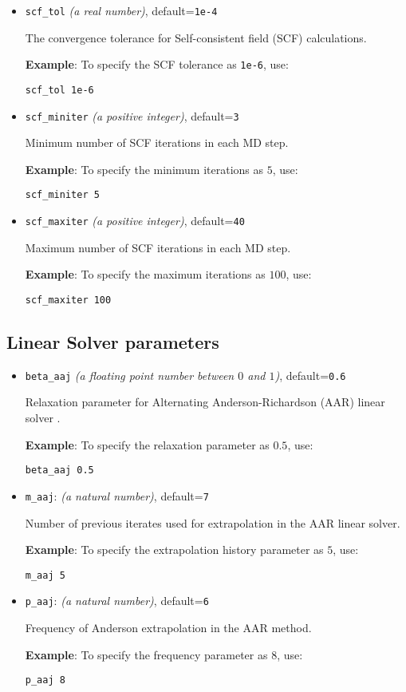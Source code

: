 \documentclass[12pt]{report}
\begin{document}
\begin{itemize}
\item\texttt{scf\_tol} {\it{(a real number)}}, default=\texttt{1e-4}

The convergence tolerance for Self-consistent field (SCF) calculations.
 
{\bf{Example}}: To specify the SCF tolerance as \texttt{1e-6}, use: 

\texttt{scf\_tol 1e-6}

\item\texttt{scf\_miniter} {\it{(a positive integer)}}, default=\texttt{3}

Minimum number of SCF iterations in each MD step.
 
{\bf{Example}}: To specify the minimum iterations as $5$, use: 

\texttt{scf\_miniter 5}

\item\texttt{scf\_maxiter} {\it{(a positive integer)}}, default=\texttt{40}

Maximum number of SCF iterations in each MD step.
 
{\bf{Example}}: To specify the maximum iterations as $100$, use: 

\texttt{scf\_maxiter 100}

\end{itemize}


\subsection{Linear Solver parameters}

\begin{itemize}
\item\texttt{beta\_aaj} {\it{(a floating point number between $0$ and $1$)}}, default=\texttt{0.6}

Relaxation parameter for Alternating Anderson-Richardson (AAR) linear solver \cite{pratapa2016anderson,suryanarayana2016alternating}.

{\bf{Example}}: To specify the relaxation parameter as $0.5$, use: 

\texttt{beta\_aaj 0.5}  

\item\texttt{m\_aaj}: {\it{(a natural number)}}, default=\texttt{7}

Number of previous iterates used for extrapolation in the AAR linear solver.

{\bf{Example}}: To specify the extrapolation history parameter as $5$, use: 

\texttt{m\_aaj 5}  

\item\texttt{p\_aaj}: {\it{(a natural number)}}, default=\texttt{6}

Frequency of Anderson extrapolation in the AAR method. 

{\bf{Example}}: To specify the frequency parameter as $8$, use: 

\texttt{p\_aaj 8}  

\end{itemize}
\end{document}
